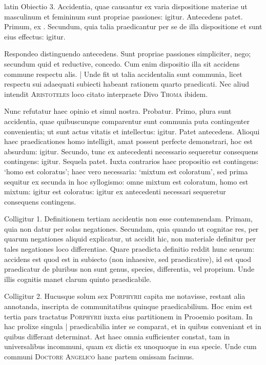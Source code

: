 \begin{otherlanguage*}{latin}
\pstart
Obiectio 3. Accidentia, quae causantur ex varia dispositione materiae ut masculinum et femininum sunt propriae passiones:
igitur. Antecedens patet. Primum, ex . Secundum, quia talia praedicantur per se de illa dispositione et sunt eius effectus:
igitur. 
\pend

\pstart
Respondeo distinguendo antecedens. Sunt propriae passiones simpliciter, nego; secundum quid et reductive, concedo. Cum enim dispositio illa sit accidens commune respectu alis. \textnormal{|} Unde fit ut talia accidentalia sunt communia, licet respectu sui adaequati subiecti habeant rationem quarto praedicati. Nec aliud intendit \textsc{Aristoteles} loco citato interpraete Divo \textsc{Thoma} ibidem. 
\pend

\pstart
Nunc refutatur haec opinio et simul nostra. Probatur. Primo, plura sunt accidentia, quae quibuscunque comparentur sunt communia puta contingenter convenientia; ut sunt actus vitatis et intellectus:
igitur. Patet antecedens. Alioqui haec praedicationes homo intelligit, amat possent perfecte demonstrari, hoc est absurdum:
igitur. Secundo, tunc ex antecedenti necessario sequeretur consequens contingens:
igitur. Sequela patet. Iuxta contrarios haec propositio est contingens:
`homo est coloratus'; haec vero necessaria:
`mixtum est coloratum', sed prima sequitur ex secunda in hoc syllogismo:
omne mixtum est coloratum, homo est mixtum:
igitur est coloratus:
igitur ex antecedenti necessari sequeretur consequens contingens. 
\pend

\pstart
Colligitur 1. Definitionem tertiam accidentis non esse contemnendam. Primam, quia non datur per solas negationes. Secundam, quia quando ut cognitae res, per quarum negationes aliquid explicatur, ut accidit hic, non materiale definitur per tales negationes loco differentiae. Quare praedicta definitio reddit hunc sensum:
accidens est quod est in subiecto (non inhaesive, sed praedicative), id est quod praedicatur de pluribus non sunt genus, species, differentia, vel proprium. Unde illis cognitis manet clarum quinto praedicabile. 
\pend

\pstart
Colligitur 2. Hucusque solum sex \textsc{Porphyrii} capita me notavisse, restant alia annotanda, inscripta de communitatibus quinque praedicabilium. Hoc enim est tertia pars tractatus \textsc{Porphyrii} iuxta eius partitionem in Prooemio positam. In hac prolixe singula \textnormal{|} praedicabilia inter se comparat, et in quibus conveniant et in quibus differant determinat. Ast haec omnia sufficienter constat, tam in universalibus incommuni, quam ex dictis ex unoquoque in sua specie. Unde cum communi \textsc{Doctore Angelico} hanc partem omissam facimus. 
\pend


\end{otherlanguage*}
